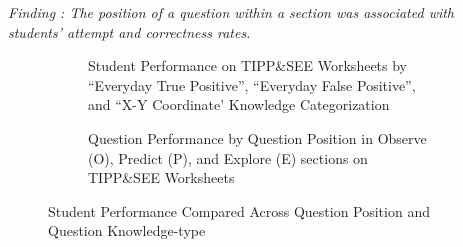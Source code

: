 \documentclass[sigconf,manuscript,review,anonymous]{acmart} %
\def\ts{TIPP\&SEE}
\begin{document}
\textit{Finding : The position of a question within a section was associated with students' attempt and correctness rates.} 

\begin{figure}
     \centering
    \begin{subfigure}[t]{0.49\textwidth}
        \caption{Student Performance on \ts{} Worksheets by ``Everyday True Positive'', ``Everyday False Positive'', and ``X-Y Coordinate' Knowledge Categorization}
        \label{fig:e_ef_s}
    \end{subfigure}
    \hfill
    \begin{subfigure}[t]{0.49\textwidth}
    \caption{Question Performance by Question Position in Observe (O), Predict (P), and Explore (E) sections on \ts{} Worksheets} 
    \label{fig:pos}
    \end{subfigure}
    \caption{Student Performance Compared Across Question Position and Question Knowledge-type}
    \label{fig:position_es}
\end{figure}
\end{document}
